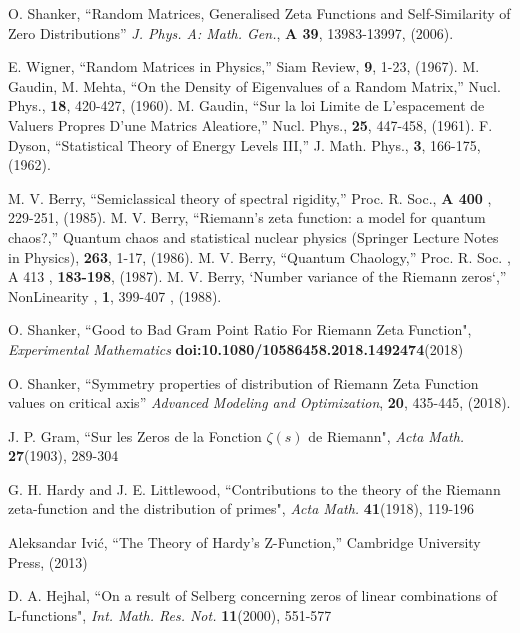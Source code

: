 \documentclass[twoside]{article}
\begin{document}

\begin{thebibliography}{10}

 O. Shanker, 
``Random Matrices, Generalised Zeta Functions and Self-Similarity of Zero Distributions''
{\it J. Phys. A: Math. Gen.}, {\bf A 39}, 13983-13997, (2006). 

 E. Wigner, “Random Matrices in Physics,” Siam Review, {\bf 9}, 1-23, (1967).
 M. Gaudin, M. Mehta, “On the Density of Eigenvalues of a Random Matrix,” 
Nucl. Phys., {\bf 18},
420-427, (1960).
 M. Gaudin, 
“Sur la loi Limite de L’espacement de Valuers Propres D’une Matrics Aleatiore,” 
Nucl. Phys., {\bf 25}, 447-458, (1961).
 F. Dyson, “Statistical Theory of Energy Levels III,” 
J. Math. Phys., {\bf 3}, 166-175, (1962).

  M. V. Berry, “Semiclassical theory of spectral rigidity,” 
Proc. R. Soc., {\bf A 400} , 229-251, (1985). 
  M. V. Berry, “Riemann’s zeta function: a model for quantum chaos?,” 
Quantum chaos and
statistical nuclear physics (Springer Lecture Notes in Physics), {\bf 263}, 1-17, (1986).
  M. V. Berry, “Quantum Chaology,” 
Proc. R. Soc. , A 413 , {\bf 183-198}, (1987).
  M. V. Berry, ‘Number variance of the Riemann zeros‘,”
 NonLinearity , {\bf 1}, 399-407 , (1988).

 O. Shanker, 
``Good to Bad Gram Point Ratio For Riemann Zeta Function",
{\it Experimental Mathematics} {\bf doi:10.1080/10586458.2018.1492474}(2018)

 O. Shanker, ``Symmetry properties of distribution of Riemann Zeta Function values on critical axis''
{\it Advanced Modeling and Optimization}, {\bf 20}, 435-445, (2018). 

 J. P. Gram, 
``Sur les Zeros de la Fonction  $\zeta ( s )$  de Riemann",
{\it Acta Math.} {\bf27}(1903), 289-304



 G. H. Hardy and J. E. Littlewood,
``Contributions to the theory of the Riemann
zeta-function and the distribution of primes",
{\it Acta Math.} {\bf41}(1918), 119-196

 Aleksandar Ivi\'c, ``The Theory of Hardy's Z-Function,''
Cambridge University Press,  (2013)

 D. A. Hejhal,
``On a result of Selberg concerning zeros of linear combinations
of L-functions", 
{\it Int. Math. Res. Not.} {\bf11}(2000), 551-577


\end{thebibliography}
\end{document}

